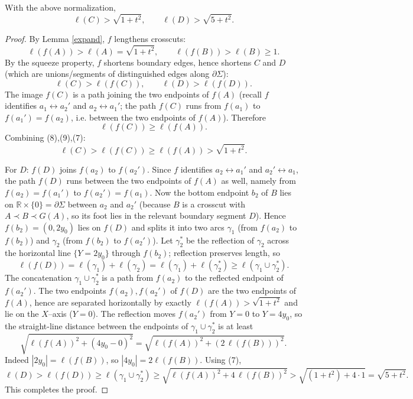 \begin{lemma}\label{bound}
With the above normalization,
\[
\ell(C)>\sqrt{1+t^2},\qquad \ell(D)>\sqrt{5+t^2}.
\]
\end{lemma}

\begin{proof}
By Lemma \ref{expand}, $f$ lengthens crosscuts:
\[
\ell(f(A))>\ell(A)=\sqrt{1+t^2},\qquad \ell(f(B))>\ell(B)\ge1. \tag{7}
\]
By the squeeze property, $f$ shortens boundary edges, hence shortens $C$ and $D$
(which are unions/segments of distinguished edges along $\partial\Sigma$):
\[
\ell(C)>\ell(f(C)),\qquad \ell(D)>\ell(f(D)). \tag{8}
\]
The image $f(C)$ is a path joining the two endpoints of $f(A)$ (recall $f$
identifies $a_1\leftrightarrow a_2'$ and $a_2\leftrightarrow a_1'$; the path $f(C)$
runs from $f(a_1)$ to $f(a_1')=f(a_2)$, i.e. between the two endpoints of $f(A)$).
Therefore
\[
\ell(f(C))\ge \ell(f(A)). \tag{9}
\]
Combining (8),(9),(7):
\[
\ell(C)>\ell(f(C))\ge\ell(f(A))>\sqrt{1+t^2}.
\]

For $D$: $f(D)$ joins $f(a_2)$ to $f(a_2')$. Since $f$ identifies
$a_2\leftrightarrow a_1'$ and $a_2'\leftrightarrow a_1$, the path $f(D)$ runs
between the two endpoints of $f(A)$ as well, namely from $f(a_2)=f(a_1')$ to
$f(a_2')=f(a_1)$. Now the bottom endpoint $b_2$ of $B$ lies on
$\mathbb{R}\times\{0\}=\partial\Sigma$ between $a_2$ and $a_2'$ (because $B$ is a
crosscut with $A\prec B\prec G(A)$, so its foot lies in the relevant boundary
segment $D$). Hence $f(b_2)=(0,2y_0)$ lies on $f(D)$ and splits it into two arcs
$\gamma_1$ (from $f(a_2)$ to $f(b_2)$) and $\gamma_2$ (from $f(b_2)$ to $f(a_2')$).
Let $\gamma_2^*$ be the reflection of $\gamma_2$ across the horizontal line
$\{Y=2y_0\}$ through $f(b_2)$; reflection preserves length, so
\[
\ell(f(D))=\ell(\gamma_1)+\ell(\gamma_2)=\ell(\gamma_1)+\ell(\gamma_2^*)
\ge \ell(\gamma_1\cup\gamma_2^*).
\]
The concatenation $\gamma_1\cup\gamma_2^*$ is a path from $f(a_2)$ to the reflected
endpoint of $f(a_2')$. The two endpoints $f(a_2),f(a_2')$ of $f(D)$ are the two
endpoints of $f(A)$, hence are separated horizontally by exactly
$\ell(f(A))>\sqrt{1+t^2}$ and lie on the $X$--axis ($Y=0$). The reflection moves
$f(a_2')$ from $Y=0$ to $Y=4y_0$, so the straight-line distance between the
endpoints of $\gamma_1\cup\gamma_2^*$ is at least
\[
\sqrt{\ell(f(A))^2+(4y_0-0)^2}=\sqrt{\ell(f(A))^2+(2\,\ell(f(B)))^2}.
\]
Indeed $|2y_0|=\ell(f(B))$, so $|4y_0|=2\ell(f(B))$. Using (7),
\[
\ell(D)>\ell(f(D))\ge \ell(\gamma_1\cup\gamma_2^*)
\ge \sqrt{\ell(f(A))^2+4\,\ell(f(B))^2}>\sqrt{(1+t^2)+4\cdot1}=\sqrt{5+t^2}.
\]
This completes the proof.
\end{proof}

